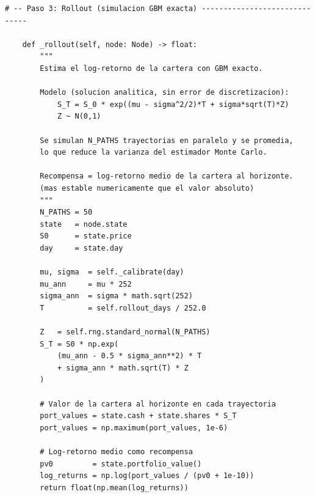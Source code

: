 \documentclass[12pt, a4paper]{article}
\begin{document}
\begin{lstlisting}[caption={Paso 3 -- Rollout GBM exacto con 50 trayectorias}]
    # -- Paso 3: Rollout (simulacion GBM exacta) ------------------------------

    def _rollout(self, node: Node) -> float:
        """
        Estima el log-retorno de la cartera con GBM exacto.

        Modelo (solucion analitica, sin error de discretizacion):
            S_T = S_0 * exp((mu - sigma^2/2)*T + sigma*sqrt(T)*Z)
            Z ~ N(0,1)

        Se simulan N_PATHS trayectorias en paralelo y se promedia,
        lo que reduce la varianza del estimador Monte Carlo.

        Recompensa = log-retorno medio de la cartera al horizonte.
        (mas estable numericamente que el valor absoluto)
        """
        N_PATHS = 50
        state   = node.state
        S0      = state.price
        day     = state.day

        mu, sigma  = self._calibrate(day)
        mu_ann     = mu * 252
        sigma_ann  = sigma * math.sqrt(252)
        T          = self.rollout_days / 252.0

        Z   = self.rng.standard_normal(N_PATHS)
        S_T = S0 * np.exp(
            (mu_ann - 0.5 * sigma_ann**2) * T
            + sigma_ann * math.sqrt(T) * Z
        )

        # Valor de la cartera al horizonte en cada trayectoria
        port_values = state.cash + state.shares * S_T
        port_values = np.maximum(port_values, 1e-6)

        # Log-retorno medio como recompensa
        pv0         = state.portfolio_value()
        log_returns = np.log(port_values / (pv0 + 1e-10))
        return float(np.mean(log_returns))
\end{lstlisting}
\end{document}
